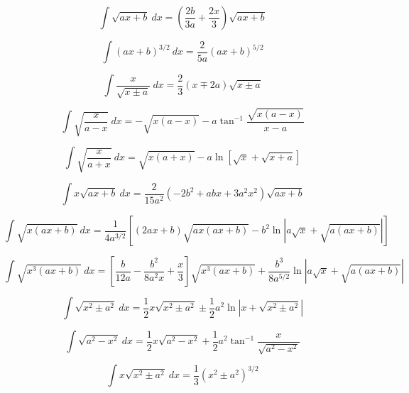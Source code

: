 \begin{equation}
\int \sqrt{ax+b}\ dx = \left(\frac{2b}{3a}+\frac{2x}{3}\right)\sqrt{ax+b} 
\end{equation}

\begin{equation}
\int (ax+b)^{3/2}\ dx =\frac{2}{5a}(ax+b)^{5/2}
\end{equation}

\begin{equation}\label{eq:Weems}
\int \frac{x}{\sqrt{x\pm a} } \ dx = \frac{2}{3}(x\mp 2a)\sqrt{x\pm a}
\end{equation}

\begin{equation}
\int \sqrt{\frac{x}{a-x}}\ dx =  -\sqrt{x(a-x)}
-a\tan^{-1}\frac{\sqrt{x(a-x)}}{x-a}
\end{equation}

\begin{equation}
\int \sqrt{\frac{x}{a+x}}\ dx =  \sqrt{x(a+x)} 
-a\ln \left [ \sqrt{x} + \sqrt{x+a}\right] 
\end{equation}

\begin{equation}
\int x \sqrt{ax + b}\ dx =
\frac{2}{15 a^2}(-2b^2+abx + 3 a^2 x^2)
\sqrt{ax+b}
\end{equation}

\begin{equation}
\int \sqrt{x(ax+b)}\ dx = \frac{1}{4a^{3/2}}\left[(2ax + b)\sqrt{ax(ax+b)} 
-b^2 \ln \left| a\sqrt{x} + \sqrt{a(ax+b)} \right| \right ] 
\end{equation}

\begin{equation}
\int \sqrt{x^3(ax+b)} \ dx =\left [ 
\frac{b}{12a}-
\frac{b^2}{8a^2x}+
\frac{x}{3}\right] 
\sqrt{x^3(ax+b)}  + 
\frac{b^3}{8a^{5/2}}\ln \left | a\sqrt{x} + \sqrt{a(ax+b)} \right |
\end{equation}

\begin{equation}
\int\sqrt{x^2 \pm a^2}\ dx = \frac{1}{2}x\sqrt{x^2\pm a^2} 
\pm\frac{1}{2}a^2 \ln \left | x + \sqrt{x^2\pm a^2} \right | 
\end{equation}

\begin{equation}
\int  \sqrt{a^2 - x^2}\ dx = \frac{1}{2} x \sqrt{a^2-x^2} 
+\frac{1}{2}a^2\tan^{-1}\frac{x}{\sqrt{a^2-x^2}}
\end{equation}

\begin{equation}
\int  x \sqrt{x^2 \pm a^2}\ dx= \frac{1}{3}\left ( x^2 \pm a^2 \right)^{3/2} 
\end{equation}

